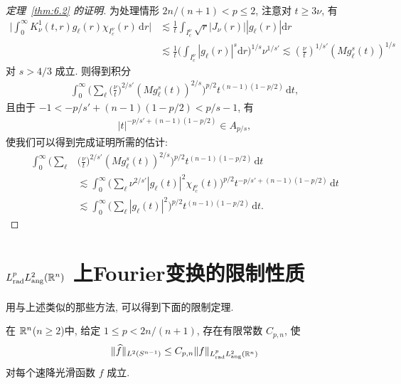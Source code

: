 \begin{proof}[定理~\ref{thm:6.2} 的证明]
为处理情形 $2n/(n+1) < p \leq 2$, 注意对 $t \geq 3\nu$, 有
\begin{align*}
  \Big|\int_{0}^{\infty}K_{\nu}^{1}(t,r)g_{\ell}(r)\chi_{I_{c}^{\nu}}(r)\,\mathrm{d}r\Big|
  &\lesssim\frac{1}{t}\int_{I_{c}^{\nu}}\sqrt{r}\left|J_{\nu}(r)\right|\left|g_{\ell}(r)\right|\mathrm{d}r\\
  &\lesssim\frac{1}{t}\Big(\int_{I_{c}^{\nu}}\left|g_{\ell}(r)\right|^{s}\mathrm{d}r\Big)^{1/s}\nu^{1/s'}
  \lesssim\left(\frac{\nu}{t}\right)^{1/s'}(Mg_{\ell}^{s}(t))^{1/s}
\end{align*}
对 $s > 4/3$ 成立. 则得到积分
\begin{align*}
  \int_{0}^{\infty}\Big(\sum_{\ell}\Big(\frac{\nu}{t}\Big)^{2/s'}(M g_{\ell}^{s}(t))^{2/s}\Big)^{p/2}t^{(n-1)(1-p/2)}\,\mathrm{d}t,
\end{align*}
且由于 $-1 < -p/s' + (n - 1)(1 - p/2) < p/s - 1$, 有
\begin{align*}
  \left|t\right|^{-p/s'+(n-1)(1-p/2)}\in A_{p/s},
\end{align*}
使我们可以得到完成证明所需的估计:
\begin{align*}
  \int_{0}^{\infty}\Big(\sum_{\ell}&\Big(\frac{\nu}{t}\Big)^{2/s'}(Mg_{\ell}^{s}(t))^{2/s}\Big)^{p/2}t^{(n-1)(1-p/2)}\,\mathrm{d}t\\
  &\lesssim\int_{0}^{\infty}\Big(\sum_{\ell}\nu^{2/s'}|g_{\ell}(t)|^{2}\chi_{I_{c}^{\nu}}(t)\Big)^{p/2}
   t^{-p/s'+(n-1)(1-p/2)}\,\mathrm{d}t\\
  &\lesssim\int_{0}^{\infty}\Big(\sum_{\ell}|g_{\ell}(t)|^{2}\Big)^{p/2}t^{(n-1)(1-p/2)}\,\mathrm{d}t.
\end{align*}
\end{proof}

\section{\texorpdfstring{$L^p_{\mathrm{rad}}L^2_{\mathrm{ang}}(\mathbb{R}^n)$ 上Fourier变换的限制性质}{𝐿ᵖ_{𝑟𝑎𝑑}𝐿²_{𝑎𝑛𝑔}(ℝⁿ) 上Fourier变换的限制性质}}

用与上述类似的那些方法, 可以得到下面的限制定理.

\begin{theorem}\label{thm:6.5}
在 $\mathbb{R}^n$($n \geq 2$)中, 给定 $1 \leq p < 2n/(n+1)$, 存在有限常数 $C_{p,n}$, 使
\begin{align*}
  \|\widehat{f}\|_{L^{2}(S^{n-1})}\leq C_{p,n}\|f\|_{L_{\mathrm{rad}}^{p}L_{\mathrm{ang}}^{2}(\mathbb{R}^{n})}
\end{align*}
对每个速降光滑函数 $f$ 成立.
\end{theorem}

